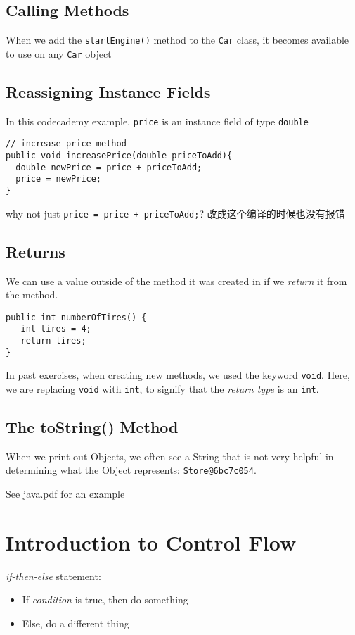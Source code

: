 \documentclass[a4paper, 12pt]{article}
\begin{document}
\subsection{Calling Methods}
When we add the \verb|startEngine()| method to the \verb|Car| class, it becomes available to use on any \verb|Car| object

\subsection{Reassigning Instance Fields}
In this codecademy example, \verb|price| is an instance field of type \verb|double|
\begin{verbatim}
// increase price method
public void increasePrice(double priceToAdd){
  double newPrice = price + priceToAdd;
  price = newPrice;
}
\end{verbatim}
why not just \verb|price = price + priceToAdd;|? 改成这个编译的时候也没有报错

\subsection{Returns}
We can use a value outside of the method it was created in if we \textit{return} it from the method.
\begin{verbatim}
public int numberOfTires() {
   int tires = 4;
   return tires;
}
\end{verbatim}
In past exercises, when creating new methods, we used the keyword \verb|void|. Here, we are replacing \verb|void| with \verb|int|, to signify that the \textit{return type} is an \verb|int|.

\subsection{The toString() Method}
When we print out Objects, we often see a String that is not very helpful in determining what the Object represents: \verb|Store@6bc7c054|.

See java.pdf for an example


\section{Introduction to Control Flow}
\textit{if-then-else} statement:
\begin{itemize}
\item If \textit{condition} is true, then do something

\item Else, do a different thing

\end{itemize}
\end{document}
